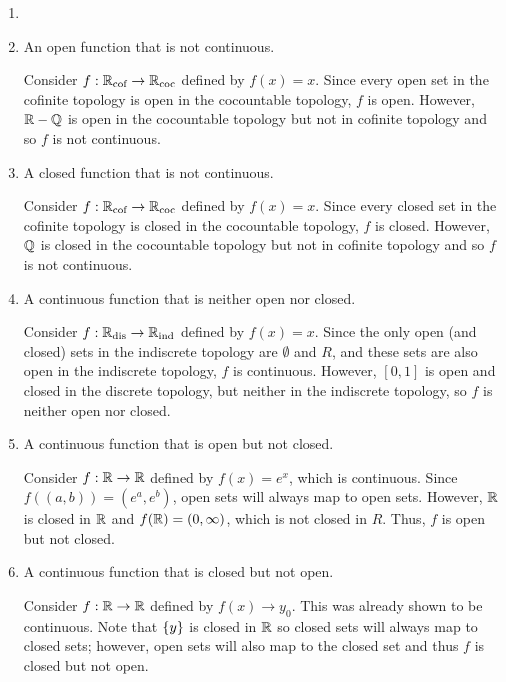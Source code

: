 \documentclass[letterpaper,12pt,fleqn]{article}
\begin{document}
\begin{example}[Exercise 7.20]
  \begin{enumerate}
  \item[]
  \item An open function that is not continuous.

    Consider \(f:\mathbb{R}_{\text{cof}}\to\mathbb{R}_{\text{coc}}\) defined by \(f(x)=x\).  Since every open set in the cofinite
    topology is open in the cocountable topology, \(f\) is open.  However, \(\mathbb{R}-\mathbb{Q}\) is open in the cocountable
    topology but not in cofinite topology and so \(f\) is not continuous.

  \item A closed function that is not continuous.

    Consider \(f:\mathbb{R}_{\text{cof}}\to\mathbb{R}_{\text{coc}}\) defined by \(f(x)=x\).  Since every closed set in the cofinite
    topology is closed in the cocountable topology, \(f\) is closed.  However, \(\mathbb{Q}\) is closed in the cocountable
    topology but not in cofinite topology and so \(f\) is not continuous.

  \item A continuous function that is neither open nor closed.

    Consider \(f:\mathbb{R}_{\text{dis}}\to\mathbb{R}_{\text{ind}}\) defined by \(f(x)=x\).  Since the only open (and closed) sets
    in the indiscrete topology are \(\emptyset\) and \(R\), and these sets are also open in the indiscrete
    topology, \(f\) is continuous.  However, \([0,1]\) is open and closed in the discrete topology, but neither
    in the indiscrete topology, so \(f\) is neither open nor closed.

  \item A continuous function that is open but not closed.

    Consider \(f:\mathbb{R}\to\mathbb{R}\) defined by \(f(x)=e^x\), which is continuous.  Since \(f((a,b))=(e^a,e^b)\), open sets
    will always map to open sets.  However, \(\mathbb{R}\) is closed in \(\mathbb{R}\) and \(f(\mathbb{R})=(0,\infty)\), which is not
    closed in \(R\).  Thus, \(f\) is open but not closed.

  \item A continuous function that is closed but not open.

    Consider \(f:\mathbb{R}\to\mathbb{R}\) defined by \(f(x)\to y_0\).  This was already shown to be continuous.  Note that
    \(\{y\}\) is closed in \(\mathbb{R}\) so closed sets will always map to closed sets; however, open sets will also
    map to the closed set and thus \(f\) is closed but not open.
  \end{enumerate}
\end{example}
\end{document}
